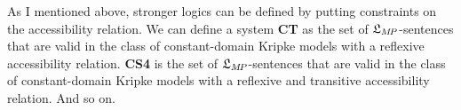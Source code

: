
%


As I mentioned above, stronger logics can be defined by putting constraints on
the accessibility relation. We can define a system \textbf{CT} as the set of
$\mathfrak{L}_{M\!P}$-sentences that are valid in the class of constant-domain Kripke
models with a reflexive accessibility relation. \textbf{CS4} is the set of
$\mathfrak{L}_{M\!P}$-sentences that are valid in the class of constant-domain Kripke
models with a reflexive and transitive accessibility relation. And so on.


